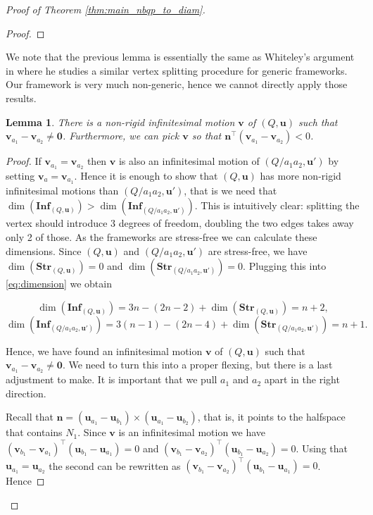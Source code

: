 \documentclass{article}
\newtheorem{lemma}[theorem]{Lemma}
\newcommand{\vu}[0]{\mathbf{u}}
\newcommand{\vv}[0]{\mathbf{v}}
\newcommand{\vn}[0]{\mathbf{n}}
\begin{document}
\begin{proof}[Proof of Theorem \ref{thm:main_nbqp_to_diam}]
\begin{proof}
    \end{proof}
    We note that the previous lemma is essentially the same as Whiteley's argument in \cite{whiteley1990vertex} where he studies a similar vertex splitting procedure for generic frameworks. Our framework is very much non-generic, hence we cannot directly apply those results. 
     
     \begin{lemma}\label{lem:infinitesimalexists}
         There is a non-rigid infinitesimal motion $\vv$ of $(Q,\vu)$ such that $\vv_{a_1}-\vv_{a_2}\neq \mathbf{0}$. Furthermore, we can pick $\vv$ so that $\vn^\top (\vv_{a_1}-\vv_{a_2})<0$.
     \end{lemma}
    \begin{proof}
        If $\vv_{a_1}=\vv_{a_2}$ then $\vv$ is also an infinitesimal motion of $(Q/a_1a_2,\vu')$ by setting $\vv_a=\vv_{a_1}$. Hence it is enough to show that $(Q,\vu)$ has more non-rigid infinitesimal motions than $(Q/a_1a_2,\vu')$, that is we need that $\dim(\mathbf{Inf}_{(Q,\vu)})>\dim(\mathbf{Inf}_{(Q/a_1a_2,\vu')})$. This is intuitively clear: splitting the vertex should introduce 3 degrees of freedom, doubling the two edges takes away only 2 of those. As the frameworks are stress-free we can calculate these dimensions. Since $(Q,\vu)$ and $(Q/a_1a_2,\vu')$ are stress-free, we have $\dim(\mathbf{Str}_{(Q,\vu)})=0$ and $\dim(\mathbf{Str}_{(Q/a_1a_2,\vu')})=0$. Plugging this into \eqref{eq:dimension} we obtain

     
    \begin{equation*}
        \dim(\mathbf{Inf}_{(Q,\vu)})=3n-(2n-2)+\dim(\mathbf{Str}_{(Q,\vu)})=n+2,
    \end{equation*}
    \begin{equation*}
        \dim(\mathbf{Inf}_{(Q/a_1a_2,\vu')})=3(n-1)-(2n-4)+\dim(\mathbf{Str}_{(Q/a_1a_2,\vu')})=n+1.
    \end{equation*}
    
  
     Hence, we have found an infinitesimal motion $\vv$ of $(Q,\vu)$ such that $\vv_{a_1}-\vv_{a_2}\neq \mathbf{0}$. We need to turn this into a proper flexing, but there is a last adjustment to make. It is important that we pull $a_1$ and $a_2$ apart in the right direction.
    
    Recall that $\vn=(\vu_{a_1}-\vu_{b_1})\times(\vu_{a_1}-\vu_{b_2})$, that is, it points to the halfspace that contains $N_1$. Since $\vv$ is an infinitesimal motion we have $(\vv_{b_1}-\vv_{a_1})^\top(\vu_{b_1}-\vu_{a_1})=0$ and $(\vv_{b_1}-\vv_{a_2})^\top(\vu_{b_1}-\vu_{a_2})=0$. Using that $\vu_{a_1}=\vu_{a_2}$ the second can be rewritten as $(\vv_{b_1}-\vv_{a_2})^\top(\vu_{b_1}-\vu_{a_1})=0$. Hence 


\end{proof}
\end{proof}
\end{document}
